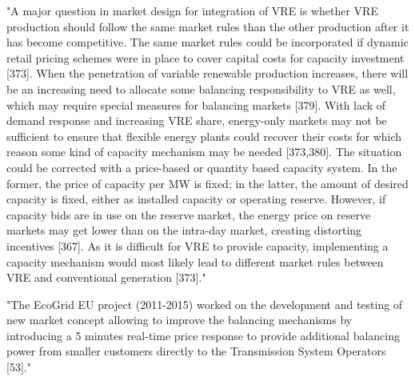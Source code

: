 "A major question in market design for integration of VRE is whether VRE production should follow the same market rules than the other production after it has become competitive. The same market rules could be incorporated if dynamic retail pricing schemes were in place to cover capital costs for capacity investment [373]. When the penetration of variable renewable production increases, there will be an increasing need to allocate some balancing responsibility to VRE as well, which may require special measures for balancing markets [379]. With lack of demand response and increasing VRE share, energy-only markets may not be sufficient to ensure that flexible energy plants could recover their costs for which reason some kind of capacity mechanism may be needed [373,380]. The situation could be corrected with a price-based or quantity based capacity system. In the former, the price of capacity per MW is fixed; in the latter, the amount of desired capacity is fixed, either as installed capacity or operating reserve. However, if capacity bids are in use on the reserve market, the energy price on reserve markets may get lower than on the intra-day market, creating distorting incentives [367]. As it is difficult for VRE to provide capacity, implementing a capacity mechanism would most likely lead to different market rules between VRE and conventional generation [373]." \cite{lund_review_2015}

"The EcoGrid EU project (2011-2015) worked on the development and testing of new market concept allowing to improve the balancing mechanisms by introducing a 5 minutes real-time price response to provide additional balancing power from smaller customers directly to the Transmission System Operators [53]." \cite{emil_hillberg_flexibility_2019}

